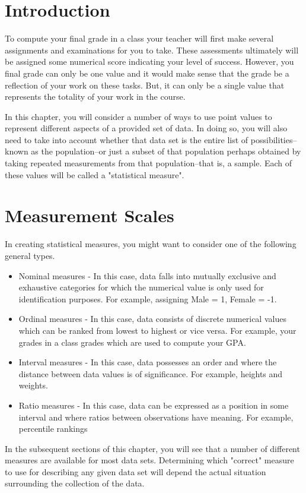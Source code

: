 \documentclass[10pt,]{book}
\theoremstyle{plain}
\theoremstyle{definition}
\theoremstyle{definition}
\theoremstyle{definition}
\numberwithin{equation}{section}
\begin{document}
\section[{Introduction}]{Introduction}\label{section-1}

To compute your final grade in a class your teacher will first make several assignments and examinations for you to take. These assessments ultimately will be assigned some numerical score indicating your level of success. However, you final grade can only be one value and it would make sense that the grade be a reflection of your work on these tasks. But, it can only be a single value that represents the totality of your work in the course. 
%
\par

In this chapter, you will consider a number of ways to use point values to represent different aspects of a provided set of data. In doing so, you will also need to take into account whether that data set is the entire list of possibilities--known as the population--or just a subset of that population perhaps obtained by taking repeated measurements from that population--that is, a sample. Each of these values will be called a "statistical measure".
%
\typeout{************************************************}
\typeout{************************************************}
\section[{Measurement Scales}]{Measurement Scales}\label{section-2}
In creating statistical measures, you might want to consider one of the following general types.%
\leavevmode%
\begin{itemize}[label=\textbullet]
\item{}Nominal measures - In this case, data falls into mutually exclusive and exhaustive categories for which the numerical value is only used for identification purposes. For example, assigning Male = 1, Female = -1.%
\item{}Ordinal measures - In this case, data consists of discrete numerical values which can be ranked from lowest to highest or vice versa. For example, your grades in a class grades which are used to compute your GPA.%
\item{}Interval measures - In this case, data possesses an order and where the distance between data values is of significance. For example, heights and weights.%
\item{}Ratio measures - In this case, data can be expressed as a position in some interval and where ratios between observations have meaning. For example, percentile rankings%
\end{itemize}
\par
In the subsequent sections of this chapter, you will see that a number of different measures are available for most data sets. Determining which "correct" measure to use for describing any given data set will depend the actual situation surrounding the collection of the data.
\par
\end{document}
